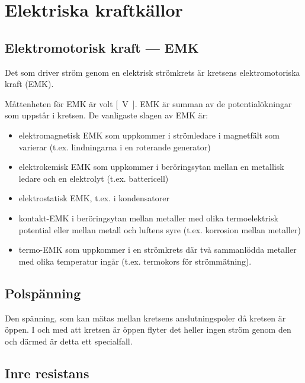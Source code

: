 \section{Elektriska kraftkällor}

\subsection{Elektromotorisk kraft --- EMK}

Det som driver ström genom en elektrisk strömkrets är kretsens elektromotoriska
kraft (EMK).

Måttenheten för EMK är \unit{volt} \unit{[V]}. EMK är summan av de 
potentialökningar som uppstår i kretsen. De vanligaste slagen av EMK är:

\begin{itemize}
\item elektromagnetisk EMK som uppkommer i strömledare i magnetfält som
varierar (t.ex. lindningarna i en roterande generator)
\item elektrokemisk EMK som uppkommer i beröringsytan mellan en metallisk
ledare och en elektrolyt (t.ex. battericell)
\item elektrostatisk EMK, t.ex. i kondensatorer
\item kontakt-EMK i beröringsytan mellan metaller med olika termoelektrisk
potential eller mellan metall och luftens syre (t.ex. korrosion mellan metaller)
\item termo-EMK som uppkommer i en strömkrets där två sammanlödda metaller med
olika temperatur ingår (t.ex. termokors för strömmätning).
\end{itemize}

\subsection{Polspänning}

Den spänning, som kan mätas mellan kretsens anslutningspoler då kretsen är öppen. 
I och med att kretsen är öppen flyter det heller ingen ström genom den och därmed 
är detta ett specialfall.

\subsection{Inre resistans}

